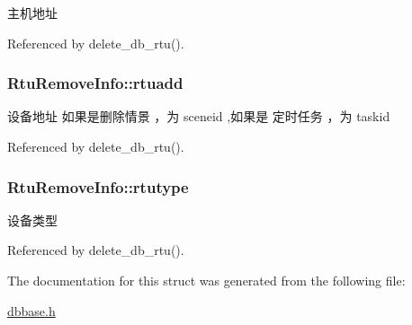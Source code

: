 主机地址 



Referenced by delete\-\_\-db\-\_\-rtu().

\hypertarget{structRtuRemoveInfo_abd5945fa06b993a70ca36d3996407fe2}{
\subsubsection[{rtuadd}]{ Rtu\-Remove\-Info\-::rtuadd}}\label{structRtuRemoveInfo_abd5945fa06b993a70ca36d3996407fe2}


设备地址 如果是删除情景 ，为 sceneid ,如果是 定时任务 ，为 taskid 



Referenced by delete\-\_\-db\-\_\-rtu().

\hypertarget{structRtuRemoveInfo_a640ae74868393c0f2aab0d23f3be8b17}{
\subsubsection[{rtutype}]{ Rtu\-Remove\-Info\-::rtutype}}\label{structRtuRemoveInfo_a640ae74868393c0f2aab0d23f3be8b17}


设备类型 



Referenced by delete\-\_\-db\-\_\-rtu().



The documentation for this struct was generated from the following file\-:\begin{DoxyCompactItemize}
\item 
\hyperlink{dbbase_8h}{dbbase.\-h}\end{DoxyCompactItemize}
